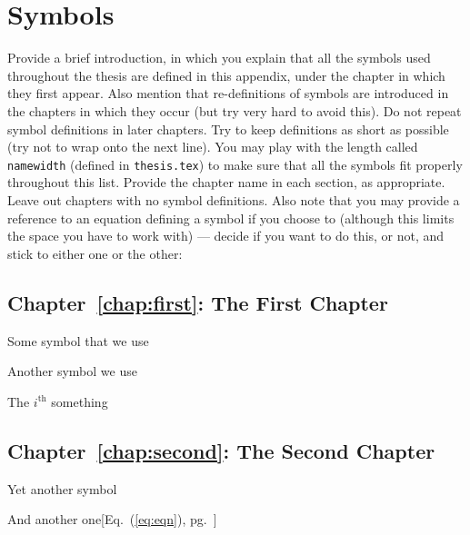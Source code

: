 
\chapter{Symbols}
\label{app:symbols}

Provide a brief introduction, in which you explain that all the symbols used throughout the thesis are defined in this appendix, under the chapter in which they first appear. Also mention that re-definitions of symbols are introduced in the chapters in which they occur (but try very hard to avoid this). Do not repeat symbol definitions in later chapters. Try to keep definitions as short as possible (try not to wrap onto the next line). You may play with the length called \texttt{namewidth} (defined in \texttt{thesis.tex}) to make sure that all the symbols fit properly throughout this list. Provide the chapter name in each section, as appropriate. Leave out chapters with no symbol definitions. Also note that you may provide a reference to an equation defining a symbol if you choose to (although this limits the space you have to work with) --- decide if you want to do this, or not, and stick to either one or the other:


\section{Chapter~\ref{chap:first}: The First Chapter}
\label{sec:symbols:first}

\begin{description}
\setlength{\itemsep}{-1mm}
	\item[\parbox{\namewidth}{$\cal A$}] Some symbol that we use
	\item[\parbox{\namewidth}{$m$}] Another symbol we use
	\item[\parbox{\namewidth}{$t_{i}$}] The $i^{\mathrm{th}}$ something
\end{description}


\section{Chapter~\ref{chap:second}: The Second Chapter}
\label{sec:symbols:SOM}

\begin{description}
\setlength{\itemsep}{-1mm}
	\item[\parbox{\namewidth}{$\beta$}] Yet another symbol
	\item[\parbox{\namewidth}{$\eta(t)$}] And another one\hfill[Eq.~(\ref{eq:eqn}), pg.~\pageref{eq:eqn}]
\end{description}

